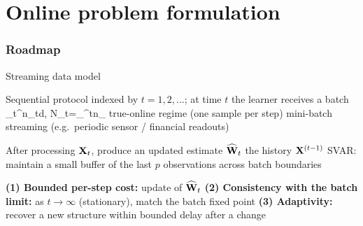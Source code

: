 \documentclass[9pt, aspectratio=169, xcolor=table]{beamer}
\begin{document}
\section{Online problem formulation}
\begin{frame} \frametitle{Roadmap} \tableofcontents[currentsection] \end{frame}


\begin{frame}{Streaming data model}\svpos

	\bi Sequential protocol indexed by $t=1,2,\ldots$; at time $t$ the learner receives a batch
	\be \bbX_t\in\reals^{n_t\times d}, \qquad N_t=\sum_{}^{t}n_\tau \;\; \ee
	\ai {} true-online regime (one sample per step)
	\ai {} mini-batch streaming (e.g.\ periodic sensor / financial readouts)\ei \svpos

	\bi After processing ${\mathbf X}_t$, produce an updated estimate $\widehat{{\mathbf W}}_t$  the history ${\mathbf X}^{(t-1)}$ \svpos
	\ai SVAR: maintain a small buffer of the last $p$ observations across batch boundaries\ei \svpos

	\pause

	\begin{myblock}
		\bi {}
		\ai \textbf{(1) Bounded per-step cost:} update of $\widehat{{\mathbf W}}_t$ 
		\ai \textbf{(2) Consistency with the batch limit:} as $t\!\to\!\infty$ (stationary), match the batch fixed point
		\ai \textbf{(3) Adaptivity:} recover a new structure within bounded delay after a change\ei
	\end{myblock}

\end{frame}

\end{document}
